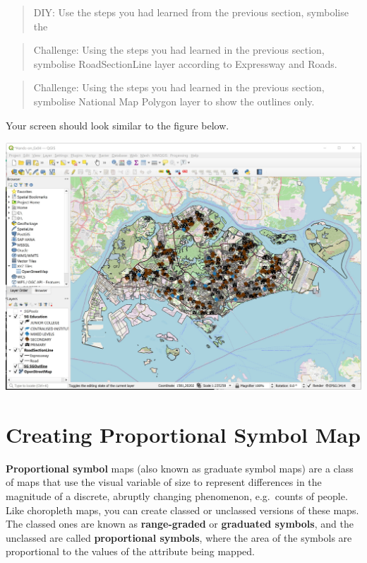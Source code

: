 \documentclass[
  letterpaper,
  DIV=11,
  numbers=noendperiod]{scrreprt}
\begin{document}
\begin{quote}
DIY: Use the steps you had learned from the previous section, symbolise
the
\end{quote}

\begin{quote}
Challenge: Using the steps you had learned in the previous section,
symbolise RoadSectionLine layer according to Expressway and Roads.
\end{quote}

\begin{quote}
Challenge: Using the steps you had learned in the previous section,
symbolise National Map Polygon layer to show the outlines only.
\end{quote}

Your screen should look similar to the figure below.

\includegraphics{./img03/image10.jpg}

\hypertarget{creating-proportional-symbol-map}{%
\section{Creating Proportional Symbol
Map}\label{creating-proportional-symbol-map}}

\textbf{Proportional symbol} maps (also known as graduate symbol maps)
are a class of maps that use the visual variable of size to represent
differences in the magnitude of a discrete, abruptly changing
phenomenon, e.g.~counts of people. Like choropleth maps, you can create
classed or unclassed versions of these maps. The classed ones are known
as \textbf{range-graded} or \textbf{graduated symbols}, and the
unclassed are called \textbf{proportional symbols}, where the area of
the symbols are proportional to the values of the attribute being
mapped.
\end{document}
